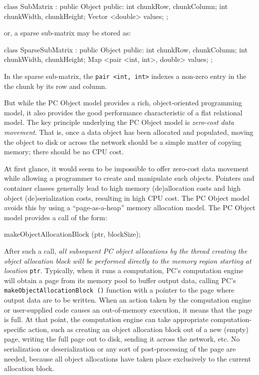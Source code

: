 \begin{code}
class SubMatrix : public Object {
public:
	int chunkRow, chunkColumn;
	int chunkWidth, chunkHeight;
	Vector <double> values; 
};
\end{code}

or, a sparse sub-matrix may be stored as:

\begin{code}
class SparseSubMatrix : public Object {
public:
	int chunkRow, chunkColumn;
	int chunkWidth, chunkHeight;
	Map <pair <int, int>, double> values; 
};
\end{code}

In the sparse sub-matrix, the \texttt{pair <int, int>} indexes a non-zero entry in the the chunk by its row and column.

But while the PC Object model provides a rich, object-oriented programming model, it also provides the good performance characteristic
of a flat relational model.
The key principle underlying the PC Object model is \emph{zero-cost data movement}.  That is, once a data object
has been allocated and populated, moving the object to disk or across the network should be a simple matter of copying memory; there
should be no CPU cost.

At first glance, it would seem to be impossible to offer zero-cost data movement while allowing a programmer to create and manipulate such objects.  
Pointers and container classes 
generally lead to high memory (de)allocation costs and high object (de)serialization costs, resulting in high CPU cost.
The PC Object model avoids this 
by using a ``page-as-a-heap'' memory allocation model.  
The PC Object model provides a call of the form:

\begin{code}
makeObjectAllocationBlock (ptr, blockSize);
\end{code}

After such a call, \emph{all subsequent PC object allocations by the thread creating the object allocation block will be performed directly to the memory
region starting at location} \texttt{ptr}.
Typically, when it runs a computation, PC's computation engine will obtain a page from its memory pool to buffer output data, calling
PC's
\texttt{makeObjectAllocationBlock ()} function with a pointer to the page where output data are to be written.  
When an action taken by the computation engine or user-supplied code causes an
out-of-memory execution, it means that the page is full.  At that point, the computation engine can take appropriate computation-specific 
action, such as creating 
an object allocation block out of a new (empty) page, writing the full page out to disk, sending it across the network, etc.  
No serialization or deserialization or any sort of post-processing of the page are needed, 
because all object allocations have taken place exclusively to the current allocation block.  

